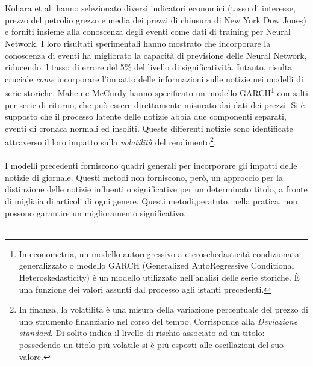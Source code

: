 \documentclass[a4paper,12pt]{report}
\begin{document}
\\~\\Kohara et al. \cite{know-nn2} hanno selezionato diversi indicatori economici (tasso di interesse, prezzo del petrolio grezzo e media dei prezzi di chiusura di New York Dow Jones) e forniti insieme alla conoscenza degli eventi come dati di training per Neural Network. I loro risultati sperimentali hanno mostrato che incorporare la conoscenza di eventi ha migliorato la capacità di previsione delle Neural Network, riducendo il tasso di errore del 5\% del livello di significatività. Intanto, risulta cruciale \textit{come} incorporare l'impatto delle informazioni sulle notizie nei modelli di serie storiche. Maheu e McCurdy \cite{26} hanno specificato un modello GARCH\footnote{In econometria, un modello autoregressivo a eteroschedasticità condizionata generalizzato o modello GARCH (Generalized AutoRegressive Conditional Heteroskedasticity) è un modello utilizzato nell'analisi delle serie storiche. È una funzione dei valori assunti dal processo agli istanti precedenti.} con salti per serie di ritorno, che può essere direttamente misurato dai dati dei prezzi. Si è supposto che il processo latente delle notizie abbia due componenti separati, eventi di cronaca normali ed insoliti. Queste differenti notizie sono identificate attraverso il loro impatto sulla \textit{volatilità} del rendimento\footnote{In finanza, la volatilità è una misura della variazione percentuale del prezzo di uno strumento finanziario nel corso del tempo. Corrisponde alla \textit{Deviazione standard}. Di solito indica il livello di rischio associato ad un titolo: possedendo un titolo più volatile si è più esposti alle oscillazioni del suo valore.}.\\~\\ I modelli precedenti forniscono quadri generali per incorporare gli impatti delle notizie di giornale. Questi metodi non forniscono, però, un approccio per la distinzione delle notizie influenti o significative per un determinato titolo, a fronte di migliaia di articoli di ogni genere. Questi metodi,peratnto, nella pratica, non possono garantire un miglioramento significativo. \\~\\
\end{document}
